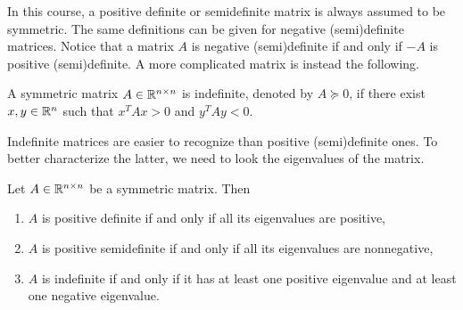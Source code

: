 \documentclass[10pt,a4paper]{article}
\begin{document}
\noindent In this course, a positive definite or semidefinite matrix is always assumed to be symmetric. The same definitions can be given for negative (semi)definite matrices. Notice that a matrix $A$ is negative (semi)definite if and only if $-A$ is positive (semi)definite. A more complicated matrix is instead the following.
\begin{definition}[Indefiniteness]
	A symmetric matrix $A\in \mathbb{R}^{n\times n}$ is indefinite, denoted by $A \succcurlyeq0$, if there exist $x,y \in \mathbb{R}^n$ such that $x^TAx> 0$ and $y^TAy<0$.
\end{definition}
Indefinite matrices are easier to recognize than positive (semi)definite ones. To better characterize the latter, we need to look the eigenvalues of the matrix.
\begin{theorem}
	Let $A\in \mathbb{R}^{n\times n}$ be a symmetric matrix. Then
	\begin{enumerate}
		\item $A$ is positive definite if and only if all its eigenvalues are positive,
		\item $A$ is positive semidefinite if and only if all its eigenvalues are nonnegative,
		\item $A$ is indefinite if and only if it has at least one positive eigenvalue and at least one
		negative eigenvalue.
	\end{enumerate}
\end{theorem}
\end{document}
